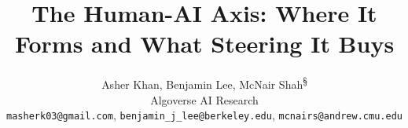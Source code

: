 \documentclass{article}
\title{The Human-AI Axis: Where It Forms and What Steering It Buys}
\author{%
    Asher Khan\textsuperscript{\dag}, Benjamin Lee, McNair Shah\textsuperscript{\S} \\
    Algoverse AI Research \\
    \texttt{masherk03@gmail.com}, \texttt{benjamin\_j\_lee@berkeley.edu}, \texttt{mcnairs@andrew.cmu.edu}
  }
\author{}
\newif\iffinalcopy
\begin{document}
\maketitle

\begin{abstract}
  
\end{abstract}














\iffinalcopy
\section*{Author Contributions}
A.K. designed the experiments and their preregistered analyses; built the
extraction, steering, and evaluation codebase; ran all experiments across all
model families, including the Jacobian-lens follow-up analyses; analyzed the
results; produced the figures; and wrote the manuscript.
B.L. built the initial axis-extraction prototype, ran the initial
Jacobian-lens diagnostics, and reviewed the manuscript.
M.S. proposed the research direction, supervised the project, and gave
feedback on the manuscript.
\fi

\newpage
\appendix
\begingroup
\makeatletter
\def\appendixtocsection#1#2{%
  \addvspace{0.35em \@plus\p@}%
  \@dottedtocline{1}{0em}{1.5em}{\bfseries #1\hspace{0.55em}#2}{\pageref*{appnav:#1}}}
\def\appendixtocsubsection#1#2{%
  \@dottedtocline{2}{1.5em}{2.3em}{#1\hspace{0.55em}#2}{\pageref*{appnav:#1}}}
\end{document}
